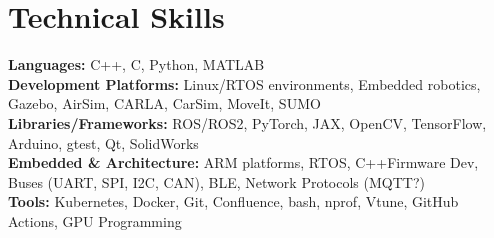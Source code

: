 \documentclass[letterpaper,10pt]{article}
\newcommand{\resumeSubHeadingListStart}{\begin{itemize}[leftmargin=0.0in, label={}]}
\newcommand{\resumeSubHeadingListEnd}{\end{itemize}}
\begin{document}

\section{Technical Skills}
 \begin{itemize}[leftmargin=0.15in, label={}]
    \small{\item{
     \textbf{Languages:}{ C++, C, Python, MATLAB} \\
     \textbf{Development Platforms:} {Linux/RTOS environments, Embedded robotics, Gazebo, AirSim, CARLA, CarSim, MoveIt, SUMO} \\
     \textbf{Libraries/Frameworks:} {ROS/ROS2, PyTorch, JAX, OpenCV, TensorFlow, Arduino, gtest, Qt, SolidWorks} \\
     \textbf{Embedded \& Architecture:} {ARM platforms, RTOS, C++\/Firmware Dev, Buses (UART, SPI, I2C, CAN), BLE, Network Protocols (MQTT?)} \\
     \textbf{Tools:} {Kubernetes, Docker, Git, Confluence, bash, nprof, Vtune, GitHub Actions, GPU Programming} \\
    }}
 \end{itemize}
 \vspace{-13pt}


\end{document}
